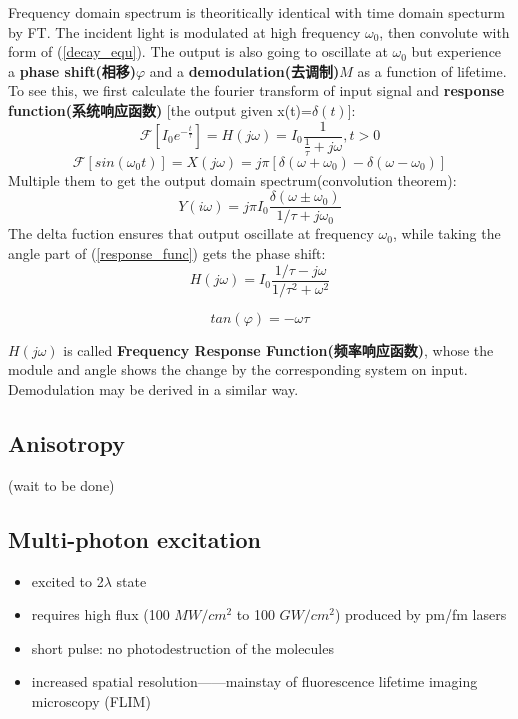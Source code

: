 \documentclass[12pt]{ctexart}
\begin{document}
\par Frequency domain spectrum is theoritically identical with time domain specturm by FT. The incident light is modulated at high frequency $\omega_0$, then convolute with form of (\ref{decay_equ}). The output is also going to oscillate at $\omega_0$ but experience a \textbf{phase shift(相移)}$\varphi$ and a \textbf{demodulation(去调制)}$M$ as a function of lifetime. To see this, we first calculate the fourier transform of input signal and \textbf{response function(系统响应函数)} [the output given x(t)=$\delta(t)$]:
\begin{equation}
    \mathscr{F}[I_0e^{-\frac{t}{\tau}}]=H(j\omega)=I_0\frac{1}{\frac{1}{\tau}+j\omega},t>0
    \label{response_func}
\end{equation}
\begin{equation}
    \mathscr{F}[sin(\omega_0t)]=X(j\omega)=j\pi[\delta(\omega+\omega_0)-\delta(\omega-\omega_0)]
\end{equation}
Multiple them to get the output domain spectrum(convolution theorem):
\begin{equation}
    Y(i\omega)=j\pi I_0\frac{\delta(\omega\pm\omega_0)}{1/\tau+j\omega_0}
\end{equation}
The delta fuction ensures that output oscillate at frequency $\omega_0$, while taking the angle part of (\ref{response_func}) gets the phase shift:
\begin{equation}
    H(j\omega)=I_0\frac{1/\tau-j\omega}{{1}/\tau^2+\omega^2}
\end{equation}
\begin{framed}
    \begin{equation}
        tan(\varphi)=-\omega\tau
    \end{equation}
\end{framed}
\noindent $H(j\omega)$ is called \textbf{Frequency Response Function(频率响应函数)}, whose the module and angle shows the change by the corresponding system on input. Demodulation may be derived in a similar way.
\subsection*{Anisotropy}
(wait to be done)
\subsection*{Multi-photon excitation}
\begin{itemize}
    \item excited to 2$\lambda$ state
    \item requires high flux (100 $MW/cm^2$ to 100 $ GW/cm^2$) produced by pm/fm lasers
    \item short pulse: no photodestruction of the molecules
    \item increased spatial resolution——mainstay of fluorescence lifetime imaging microscopy (FLIM)
\end{itemize}
\end{document}
